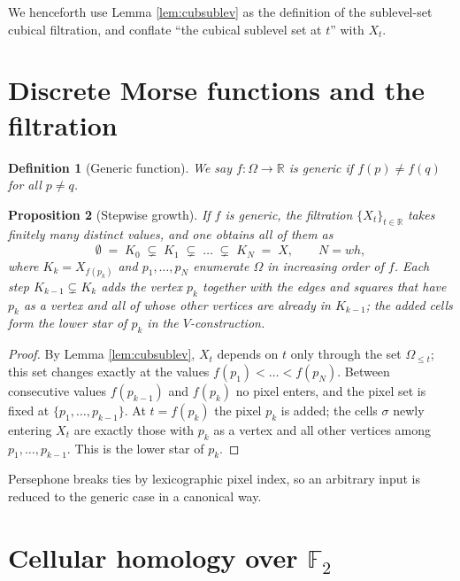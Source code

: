 \documentclass[11pt]{article}
\theoremstyle{persdef}
\newtheorem{definition}{Definition}[section]
\newtheorem{proposition}[definition]{Proposition}
\newcommand{\R}{\mathbb{R}}
\newcommand{\F}{\mathbb{F}}
\newcommand{\Ftwo}{\F_2}
\newcommand{\X}{X}
\newcommand{\sublevL}[2]{#1_{\leq #2}}
\begin{document}
\noindent
We henceforth use Lemma \ref{lem:cubsublev} as the definition of the sublevel-set cubical filtration, and conflate ``the cubical sublevel set at $t$'' with $\X_t$.

\section{Discrete Morse functions and the filtration}

\begin{definition}[Generic function]\label{def:generic}
We say $f:\Omega\to\R$ is \emph{generic} if $f(p)\neq f(q)$ for all $p\neq q$.
\end{definition}

\begin{proposition}[Stepwise growth]\label{prop:stepwise}
If $f$ is generic, the filtration $\{\X_t\}_{t\in\R}$ takes finitely many distinct values, and one obtains all of them as
\[
\emptyset \;=\; K_0 \;\subsetneq\; K_1 \;\subsetneq\; \dots \;\subsetneq\; K_N \;=\; \X, \qquad N = wh,
\]
where $K_k = \X_{f(p_k)}$ and $p_1,\dots,p_N$ enumerate $\Omega$ in increasing order of $f$. Each step $K_{k-1}\subsetneq K_k$ adds the vertex $p_k$ together with the edges and squares that have $p_k$ as a vertex and all of whose other vertices are already in $K_{k-1}$; the added cells form the \emph{lower star} of $p_k$ in the $V$-construction.
\end{proposition}

\begin{proof}
By Lemma \ref{lem:cubsublev}, $\X_t$ depends on $t$ only through the set $\sublevL{\Omega}{t}$; this set changes exactly at the values $f(p_1)<\dots<f(p_N)$. Between consecutive values $f(p_{k-1})$ and $f(p_k)$ no pixel enters, and the pixel set is fixed at $\{p_1,\dots,p_{k-1}\}$. At $t=f(p_k)$ the pixel $p_k$ is added; the cells $\sigma$ newly entering $\X_t$ are exactly those with $p_k$ as a vertex and all other vertices among $p_1,\dots,p_{k-1}$. This is the lower star of $p_k$.
\end{proof}

\noindent
Persephone breaks ties by lexicographic pixel index, so an arbitrary input is reduced to the generic case in a canonical way.

\section{Cellular homology over \texorpdfstring{$\Ftwo$}{F2}}
\end{document}
